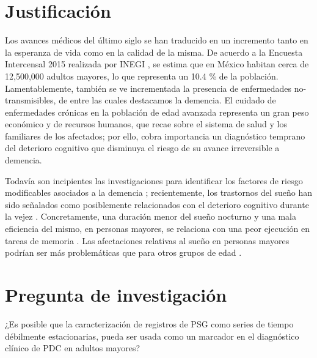 \documentclass[12pt,a4paper]{mitthesis}
\begin{document}

\section{Justificaci\'on}

Los avances m\'edicos del \'ultimo siglo se han traducido en un incremento tanto en la esperanza de 
vida como en la calidad de la misma. 
De acuerdo a la Encuesta Intercensal 2015 realizada por INEGI \cite{Intercensal15}, se estima que
en M\'exico habitan cerca de 12,500,000 adultos mayores, lo que representa un 10.4 \%  de la 
poblaci\'on.
Lamentablemente, tambi\'en se ve incrementada la presencia de enfermedades no-transmisibles, de 
entre las cuales destacamos la demencia.
El cuidado de enfermedades cr\'onicas en la poblaci\'on de edad avanzada representa un gran peso 
econ\'omico y de recursos humanos, que recae sobre el sistema de salud y los familiares de los 
afectados; por ello, cobra importancia un diagn\'ostico temprano del deterioro cognitivo que 
disminuya el riesgo de su avance irreversible a demencia.

Todav\'ia son incipientes las investigaciones para identificar los factores de riesgo modificables 
asociados a la demencia \cite{PlanAlzheimer04}; recientemente, los trastornos del sue\~no han sido 
se\~nalados como posiblemente relacionados con el deterioro cognitivo durante la vejez 
\cite{Amer13,Miyata13,Potvin12}. Concretamente, una duraci\'on menor del sue\~no nocturno y una 
mala eficiencia del mismo, en personas mayores, se relaciona con una peor ejecuci\'on en tareas de 
memoria \cite{Reid06}. Las afectaciones relativas al sue\~no en personas mayores podr\'ian ser 
m\'as problem\'aticas que para otros grupos de edad \cite{Potvin12}.


\section{Pregunta de investigaci\'on}

¿Es posible que la caracterizaci\'on de registros de PSG como series de tiempo d\'ebilmente 
estacionarias, pueda ser usada como un marcador en el diagn\'ostico cl\'inico de PDC en adultos 
mayores?
\end{document}
